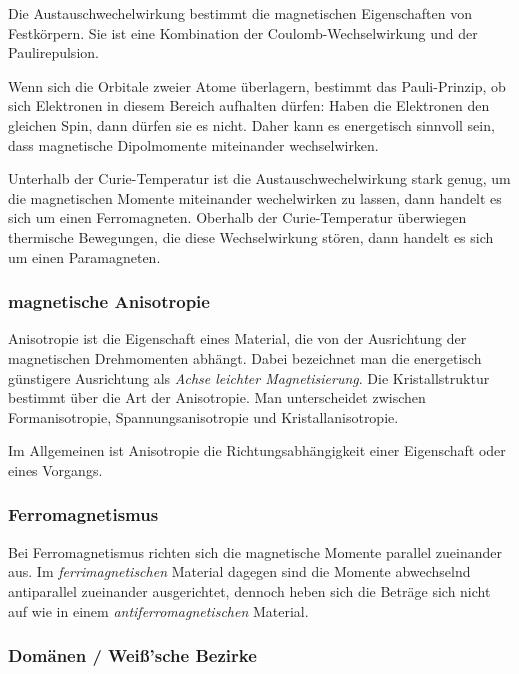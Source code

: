 \documentclass[12pt,a4paper]{scrartcl}
\numberwithin{equation}{section} %
\begin{document}
Die Austauschwechelwirkung bestimmt die magnetischen Eigenschaften von
Festkörpern. Sie ist eine Kombination der Coulomb-Wechselwirkung und der
Paulirepulsion.

Wenn sich die Orbitale zweier Atome überlagern, bestimmt das
Pauli-Prinzip, ob sich Elektronen in diesem Bereich aufhalten dürfen:
Haben die Elektronen den gleichen Spin, dann dürfen sie es nicht. Daher
kann es energetisch sinnvoll sein, dass magnetische Dipolmomente
miteinander wechselwirken.

Unterhalb der Curie-Temperatur ist die Austauschwechelwirkung stark
genug, um die magnetischen Momente miteinander wechelwirken zu lassen,
dann handelt es sich um einen Ferromagneten. Oberhalb der
Curie-Temperatur überwiegen thermische Bewegungen, die diese
Wechselwirkung stören, dann handelt es sich um einen Paramagneten.

\hypertarget{magnetische-anisotropie}{%
\subsubsection{magnetische Anisotropie}\label{magnetische-anisotropie}}

Anisotropie ist die Eigenschaft eines Material, die von der Ausrichtung
der magnetischen Drehmomenten abhängt. Dabei bezeichnet man die
energetisch günstigere Ausrichtung als \emph{Achse leichter
Magnetisierung}. Die Kristallstruktur bestimmt über die Art der
Anisotropie. Man unterscheidet zwischen Formanisotropie,
Spannungsanisotropie und Kristallanisotropie.

Im Allgemeinen ist Anisotropie die Richtungsabhängigkeit einer
Eigenschaft oder eines Vorgangs.

\hypertarget{ferromagnetismus}{%
\subsubsection{Ferromagnetismus}\label{ferromagnetismus}}

Bei Ferromagnetismus richten sich die magnetische Momente parallel
zueinander aus. Im \emph{ferrimagnetischen} Material dagegen sind die
Momente abwechselnd antiparallel zueinander ausgerichtet, dennoch heben
sich die Beträge sich nicht auf wie in einem
\emph{antiferromagnetischen} Material.

\hypertarget{domuxe4nen-weiuxdfsche-bezirke}{%
\subsubsection{Domänen / Weiß'sche
Bezirke}\label{domuxe4nen-weiuxdfsche-bezirke}}
\end{document}

